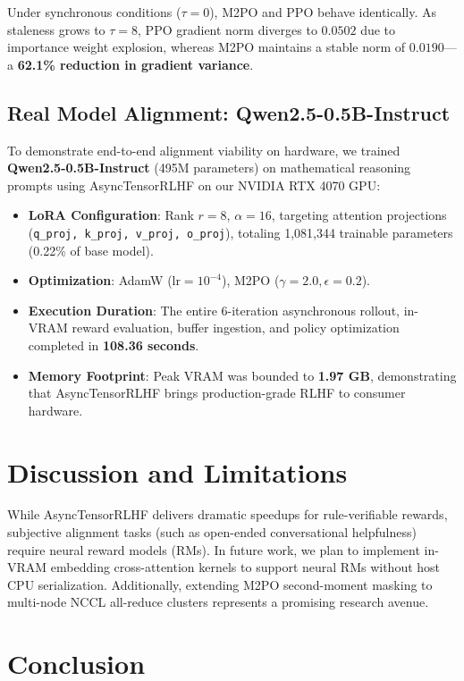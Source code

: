 \documentclass[10pt,twocolumn,letterpaper]{article}
\begin{document}
Under synchronous conditions ($\tau=0$), M2PO and PPO behave identically. As staleness grows to $\tau=8$, PPO gradient norm diverges to $0.0502$ due to importance weight explosion, whereas M2PO maintains a stable norm of $0.0190$---a \textbf{62.1\% reduction in gradient variance}.

\subsection{Real Model Alignment: Qwen2.5-0.5B-Instruct}

To demonstrate end-to-end alignment viability on hardware, we trained \textbf{Qwen2.5-0.5B-Instruct} (495M parameters) on mathematical reasoning prompts using AsyncTensorRLHF on our NVIDIA RTX 4070 GPU:
\begin{itemize}
    \item \textbf{LoRA Configuration}: Rank $r=8$, $\alpha=16$, targeting attention projections (\texttt{q\_proj, k\_proj, v\_proj, o\_proj}), totaling 1,081,344 trainable parameters (0.22\% of base model).
    \item \textbf{Optimization}: AdamW ($\text{lr}=10^{-4}$), M2PO ($\gamma=2.0, \epsilon=0.2$).
    \item \textbf{Execution Duration}: The entire 6-iteration asynchronous rollout, in-VRAM reward evaluation, buffer ingestion, and policy optimization completed in \textbf{108.36 seconds}.
    \item \textbf{Memory Footprint}: Peak VRAM was bounded to \textbf{1.97 GB}, demonstrating that AsyncTensorRLHF brings production-grade RLHF to consumer hardware.
\end{itemize}

\section{Discussion and Limitations}

While AsyncTensorRLHF delivers dramatic speedups for rule-verifiable rewards, subjective alignment tasks (such as open-ended conversational helpfulness) require neural reward models (RMs). In future work, we plan to implement in-VRAM embedding cross-attention kernels to support neural RMs without host CPU serialization. Additionally, extending M2PO second-moment masking to multi-node NCCL all-reduce clusters represents a promising research avenue.

\section{Conclusion}
\end{document}
